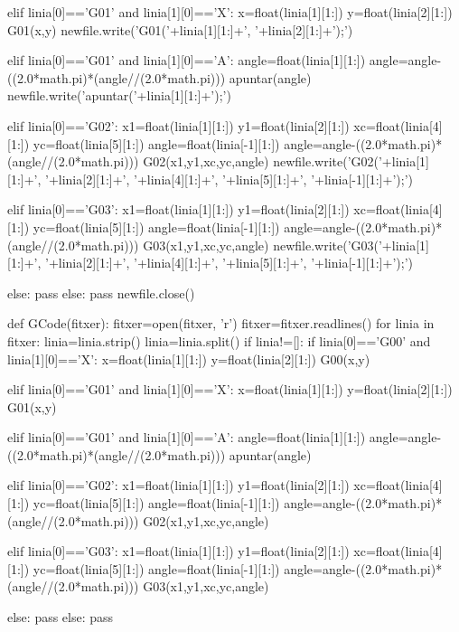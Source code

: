 \begin{python}
				elif linia[0]=='G01' and linia[1][0]=='X':
					x=float(linia[1][1:])
					y=float(linia[2][1:])
					G01(x,y)
					newfile.write('G01('+linia[1][1:]+', '+linia[2][1:]+');\n')
				
				elif linia[0]=='G01' and linia[1][0]=='A':
					angle=float(linia[1][1:])
					angle=angle-((2.0*math.pi)*(angle//(2.0*math.pi)))
					apuntar(angle)
					newfile.write('apuntar('+linia[1][1:]+');\n')
				
				elif linia[0]=='G02':
					x1=float(linia[1][1:])
					y1=float(linia[2][1:])
					xc=float(linia[4][1:])
					yc=float(linia[5][1:])
					angle=float(linia[-1][1:])
					angle=angle-((2.0*math.pi)*(angle//(2.0*math.pi)))
					G02(x1,y1,xc,yc,angle)
					newfile.write('G02('+linia[1][1:]+', '+linia[2][1:]+', '+linia[4][1:]+', '+linia[5][1:]+', '+linia[-1][1:]+');\n')
				
				elif linia[0]=='G03':
					x1=float(linia[1][1:])
					y1=float(linia[2][1:])
					xc=float(linia[4][1:])
					yc=float(linia[5][1:])
					angle=float(linia[-1][1:])
					angle=angle-((2.0*math.pi)*(angle//(2.0*math.pi)))
					G03(x1,y1,xc,yc,angle)
					newfile.write('G03('+linia[1][1:]+', '+linia[2][1:]+', '+linia[4][1:]+', '+linia[5][1:]+', '+linia[-1][1:]+');\n')
				
				else:
					pass
			else:
				pass
		newfile.close()
	
	
	def GCode(fitxer):
		fitxer=open(fitxer, 'r')
		fitxer=fitxer.readlines()
		for linia in fitxer:
			linia=linia.strip()
			linia=linia.split()
			if linia!=[]:
				if linia[0]=='G00' and linia[1][0]=='X':
					x=float(linia[1][1:])
					y=float(linia[2][1:])
					G00(x,y)
				
				
				elif linia[0]=='G01' and linia[1][0]=='X':
					x=float(linia[1][1:])
					y=float(linia[2][1:])
					G01(x,y)
				
				
				elif linia[0]=='G01' and linia[1][0]=='A':
					angle=float(linia[1][1:])
					angle=angle-((2.0*math.pi)*(angle//(2.0*math.pi)))
					apuntar(angle)
				
				
				elif linia[0]=='G02':
					x1=float(linia[1][1:])
					y1=float(linia[2][1:])
					xc=float(linia[4][1:])
					yc=float(linia[5][1:])
					angle=float(linia[-1][1:])
					angle=angle-((2.0*math.pi)*(angle//(2.0*math.pi)))
					G02(x1,y1,xc,yc,angle)
				
				
				elif linia[0]=='G03':
					x1=float(linia[1][1:])
					y1=float(linia[2][1:])
					xc=float(linia[4][1:])
					yc=float(linia[5][1:])
					angle=float(linia[-1][1:])
					angle=angle-((2.0*math.pi)*(angle//(2.0*math.pi)))
					G03(x1,y1,xc,yc,angle)
			
		
				else:
					pass
			else:
				pass
\end{python}

